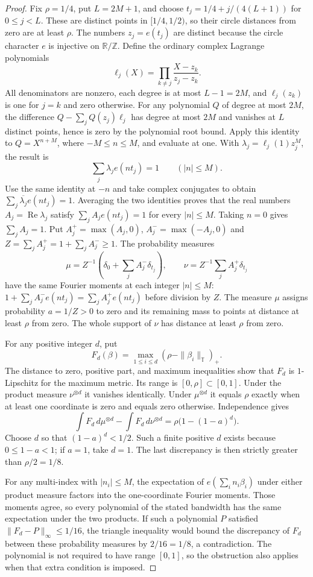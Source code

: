 \begin{proof}
Fix $\rho=1/4$, put $L=2M+1$, and choose
$t_j=1/4+j/(4(L+1))$ for $0\leq j<L$.
These are distinct points in $[1/4,1/2)$, so their circle distances from
zero are at least $\rho$.  The numbers $z_j=e(t_j)$ are distinct because
the circle character $e$ is injective on $\mathbb R/\mathbb Z$.
Define the ordinary complex Lagrange polynomials
\[
 \ell_j(X)=\prod_{k\ne j}\frac{X-z_k}{z_j-z_k}.
\]
All denominators are nonzero, each degree is at most $L-1=2M$, and
$\ell_j(z_k)$ is one for $j=k$ and zero otherwise.
For any polynomial $Q$ of degree at most $2M$, the difference
$Q-\sum_j Q(z_j)\ell_j$ has degree at most $2M$ and vanishes at $L$
distinct points, hence is zero by the polynomial root bound.
Apply this identity to $Q=X^{n+M}$, where $-M\leq n\leq M$, and evaluate
at one.  With $\lambda_j=\ell_j(1)z_j^M$, the result is
\[
 \sum_j\lambda_j e(nt_j)=1\qquad(|n|\leq M).
\]
Use the same identity at $-n$ and take complex conjugates to obtain
$\sum_j\overline{\lambda_j}e(nt_j)=1$.
Averaging the two identities proves that the real numbers
$A_j=\operatorname{Re}\lambda_j$ satisfy
$\sum_j A_j e(nt_j)=1$ for every $|n|\leq M$.
Taking $n=0$ gives $\sum_jA_j=1$.
Put $A_j^+=\max(A_j,0)$, $A_j^-=\max(-A_j,0)$ and
$Z=\sum_jA_j^+=1+\sum_jA_j^-\geq1$.
The probability measures
\[
 \mu=Z^{-1}\left(\delta_0+\sum_jA_j^-\delta_{t_j}\right),
 \qquad \nu=Z^{-1}\sum_jA_j^+\delta_{t_j}
\]
have the same Fourier moments at each integer $|n|\leq M$:
$1+\sum_j A_j^-e(nt_j)=\sum_j A_j^+e(nt_j)$ before division by $Z$.
The measure $\mu$ assigns probability $a=1/Z>0$ to zero and its remaining
mass to points at distance at least $\rho$ from zero.
The whole support of $\nu$ has distance at least $\rho$ from zero.

For any positive integer $d$, put
\[
 F_d(\beta)=\max_{1\leq i\leq d}
                 (\rho-\|\beta_i\|_{\mathbb T})_+.
\]
The distance to zero, positive part, and maximum inequalities show that
$F_d$ is $1$-Lipschitz for the maximum metric.
Its range is $[0,\rho]\subset[0,1]$.
Under the product measure $\nu^{\otimes d}$ it vanishes identically.
Under $\mu^{\otimes d}$ it equals $\rho$ exactly when at least one
coordinate is zero and equals zero otherwise.  Independence gives
\[
 \int F_d\,d\mu^{\otimes d}-\int F_d\,d\nu^{\otimes d}
       =\rho\bigl(1-(1-a)^d\bigr).
\]
Choose $d$ so that $(1-a)^d<1/2$.  Such a finite positive $d$ exists
because $0\leq1-a<1$; if $a=1$, take $d=1$.
The last discrepancy is then strictly greater than $\rho/2=1/8$.

For any multi-index with $|n_i|\leq M$, the expectation of
$e(\sum_i n_i\beta_i)$ under either product measure factors into the
one-coordinate Fourier moments.  Those moments agree, so every polynomial
of the stated bandwidth has the same expectation under the two products.
If such a polynomial $P$ satisfied $\|F_d-P\|_\infty\leq1/16$, the
triangle inequality would bound the discrepancy of $F_d$ between these
probability measures by $2/16=1/8$, a contradiction.
The polynomial is not required to have range $[0,1]$, so the obstruction
also applies when that extra condition is imposed.


\end{proof}
